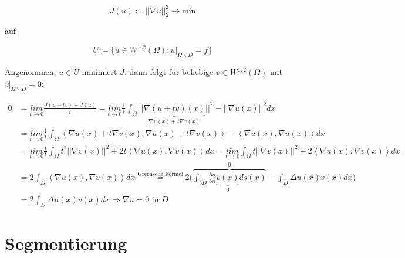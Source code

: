 \documentclass[ngerman]{article}
\theoremstyle{plain}
\theoremstyle{definition}
\numberwithin{equation}{section}
\newcommand{\norm}[1] {
\left|\left| #1 \right|\right|
}
\newcommand{\skprod}[2]{
\left \langle #1,#2 \right \rangle
}
\begin{document}
    \[ J(u) \coloneqq  \norm{\nabla u}_2^2 \to \text{min} \]

    auf

    \[U \coloneqq \{u \in W^{1,2}(\Omega) : u|_{\Omega \backslash D} = f\} \]

    Angenommen, $u \in U$ minimiert $J$, dann folgt für beliebige $v \in W^{1,2} (\Omega)$ mit $v|_{\Omega \backslash D}=0$:

    \begin{align*}
      0 &= \underset{t \to 0}{lim} \frac{J(u+tv) - J(u)}{t} = \underset{t \to 0}{lim} \frac{1}{t} \int_\Omega ||\underbrace{\nabla(u+tv)(x)}_{\nabla u(x) + t \nabla v(x)}||^2 - \norm{\nabla u(x)}^2 dx\\
      &=\underset{t \to 0}{lim} \frac{1}{t} \int_\Omega \skprod{\nabla u(x) + t \nabla v(x)}{\nabla u(x) + t \nabla v(x)} - \skprod{\nabla u (x)}{\nabla u (x)} dx\\
      &=\underset{t \to 0}{lim} \frac{1}{t} \int_\Omega t^2 \norm{\nabla v(x)}^2 + 2 t \skprod{\nabla u(x)}{\nabla v(x)} dx =  \underset{t \to 0}{lim} \int_\Omega t \norm{\nabla v(x)}^2 + 2 \skprod{\nabla u(x)}{\nabla v(x)} dx\\
      &=2 \int_D \skprod{\nabla u(x)}{\nabla v(x)} dx \overset{\text{Greensche Formel}}{=} 2 \biggl( \overbrace{\int_{\delta D} \frac{\partial u}{\partial n} \underbrace{v(x)}_{0} ds(x)}^{0} - \int_D \Delta u(x) v(x) dx \biggr)\\
      &=2 \int_D \Delta u(x) v(x) dx \Rightarrow \nabla u =0 \text{ in } D
    \end{align*}

    \section{Segmentierung}
\end{document}
